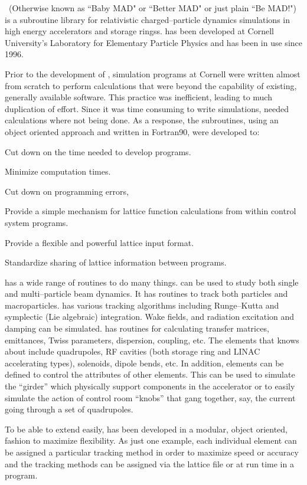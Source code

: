 
\bmad\ (Otherwise known as ``Baby MAD" or ``Better MAD" or just plain
``Be MAD!") is a subroutine library for relativistic
charged--particle dynamics simulations in high energy accelerators and
storage ringss. \bmad has been developed at Cornell University's
Laboratory for Elementary Particle Physics and has been in use since
1996. 

Prior to the development of \bmad, simulation programs at Cornell were
written almost from scratch to perform calculations that were beyond
the capability of existing, generally available software. This
practice was inefficient, leading to much duplication of effort.
Since it was time consuming to write simulations, needed calculations
where not being done.  As a response, the \bmad subroutines, using an
object oriented approach and written in Fortran90, were developed to:
\begin{Itemize}
\item Cut down on the time needed to develop programs.
\item Minimize computation times.
\item Cut down on programming errors, 
\item Provide a simple mechanism for lattice function calculations
from within control system programs.
\item Provide a flexible and powerful lattice input format.
\item Standardize sharing of lattice information between 
programs.
\end{Itemize}

\bmad has a wide range of routines to do many things.  \bmad can be
used to study both single and multi--particle beam dynamics.  It has
routines to track both particles and macroparticles. \bmad has various
tracking algorithms including Runge--Kutta and symplectic (Lie
algebraic) integration.  Wake fields, and radiation excitation and
damping can be simulated. \bmad has routines for calculating transfer
matrices, emittances, Twiss parameters, dispersion, coupling, etc. The
elements that \bmad knows about include quadrupoles, RF cavities (both
storage ring and LINAC accelerating types), solenoids, dipole bends,
etc. In addition, elements can be defined to control the attributes of
other elements. This can be used to simulate the ``girder'' which
physically support components in the accelerator or to easily simulate
the action of control room ``knobs'' that gang together, say, the
current going through a set of quadrupoles.

To be able to extend \bmad easily, \bmad has been developed in a
modular, object oriented, fashion to maximize flexibility. As just one
example, each individual element can be assigned a particular tracking
method in order to maximize speed or accuracy and the tracking methods
can be assigned via the lattice file or at run time in a program.


\vfill
\break
